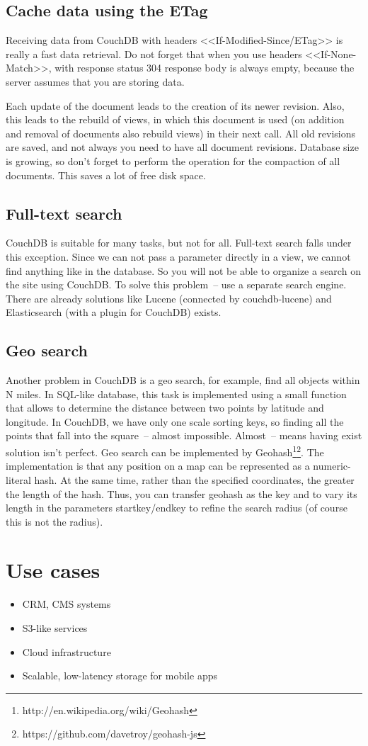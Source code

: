 \subsection{Cache data using the ETag}

Receiving data from CouchDB with headers <<If-Modified-Since/ETag>> is really a fast data retrieval. Do not forget that when you use headers <<If-None-Match>>, with response status 304 response body is always empty, because the server assumes that you are storing data.

Each update of the document leads to the creation of its newer revision. Also, this leads to the rebuild of views, in which this document is used (on addition and removal of documents also rebuild views) in their next call. All old revisions are saved, and not always you need to have all document revisions. Database size is growing, so don't forget to perform the operation for the compaction of all documents. This saves a lot of free disk space.

\subsection{Full-text search}

CouchDB is suitable for many tasks, but not for all. Full-text search falls under this exception. Since we can not pass a parameter directly in a view, we cannot find anything like in the database. So you will not be able to organize a search on the site using CouchDB. To solve this problem~-- use a separate search engine. There are already solutions like Lucene (connected by couchdb-lucene) and Elasticsearch (with a plugin for CouchDB) exists.

\subsection{Geo search}

Another problem in CouchDB is a geo search, for example, find all objects within N miles. In SQL-like database, this task is implemented using a small function that allows to determine the distance between two points by latitude and longitude. In CouchDB, we have only one scale sorting keys, so finding all the points that fall into the square~-- almost impossible. Almost~-- means having exist solution isn’t perfect. Geo search can be implemented by Geohash\footnote{http://en.wikipedia.org/wiki/Geohash}\footnote{https://github.com/davetroy/geohash-js}. The implementation is that any position on a map can be represented as a numeric-literal hash. At the same time, rather than the specified coordinates, the greater the length of the hash. Thus, you can transfer geohash as the key and to vary its length in the parameters startkey/endkey to refine the search radius (of course this is not the radius).


\section{Use cases}

\begin{itemize}
  \item CRM, CMS systems
  \item S3-like services
  \item Cloud infrastructure
  \item Scalable, low-latency storage for mobile apps
\end{itemize}